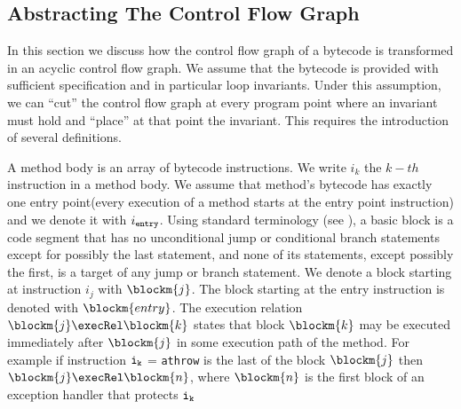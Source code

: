 
\subsection{Abstracting The Control Flow Graph}\label{abstrCntrFlow}
In this section we discuss how the control flow graph of a bytecode is transformed in an acyclic control flow graph. We assume that the bytecode is provided 
with sufficient specification and in particular loop invariants. Under this assumption, we can ``cut'' the control flow graph at every program point
where an invariant must hold and ``place'' at that point the invariant. This requires the introduction of several definitions.
     
 A method body is an array of bytecode instructions. We write $i_k$ the $k-th$ instruction in a method body.
 We assume that method's bytecode has exactly one entry point(every execution of a method starts at the entry point instruction) and we denote it with $i_{\tt{entry}}$. Using 
standard terminology (see \cite{ARUCom1986}), a
basic block is a code segment that has no unconditional jump or
conditional branch statements except for possibly the last
statement, and none of its statements, except possibly the first,
is a target of any jump or branch statement. 
 We denote a block starting at instruction  $i_{j}$ with $\blockm{j}$. The block starting at the entry instruction is denoted with $\blockm{entry}$.
 The execution relation  $\blockm{j} \execRel \blockm{k}$  states that block $\blockm{k}$ may be executed immediately after $\blockm{j}$ in some execution path of the method. For example if  instruction $\tt{i_{k}}$ = \texttt{athrow} is the last of the block $\blockm{j}$ then 
$\blockm{j} \execRel \blockm{n}$, where  $\blockm{n}$ is the first block of an exception handler that protects $\tt{i_{k}}$ 
